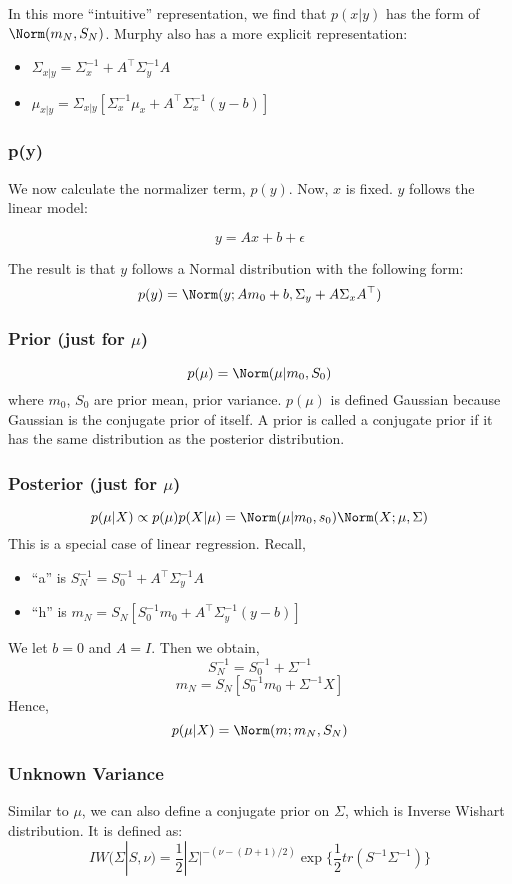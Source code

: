 \documentclass{article}
\begin{document}
In this more ``intuitive'' representation, we find that $p(x|y)$ has the form of $\Norm(m_N, S_N)$. Murphy also has a more explicit representation:

\begin{itemize}
\item $\Sigma_{x|y} = \Sigma_x^{-1} + A^\top \Sigma_y^{-1}A$
\item $\mu_{x|y} = \Sigma_{x|y} [\Sigma_x^{-1} \mu_x + A^\top \Sigma_x^{-1}(y - b)]$
\end{itemize}

\subsubsection{p(y)}

We now calculate the normalizer term, $p(y)$. Now, $x$ is fixed. $y$ follows the linear model:

$$y = Ax + b + \epsilon$$

The result is that $y$ follows a Normal distribution with the following form:
$$p(y) = \Norm(y;Am_0 + b, \Sigma_y + A \Sigma_x A^\top)$$

\subsubsection{Prior (just for $\mu$)}
$$p(\mu) = \Norm(\mu|m_0,S_0)$$
where $m_0$, $S_0$ are prior mean, prior variance. $p(\mu)$ is defined Gaussian because Gaussian is the conjugate prior of itself. A prior is called a conjugate prior if it has the same distribution as the posterior distribution.

\subsubsection{Posterior (just for $\mu$)}
$$p(\mu|X) \propto p(\mu)p(X|\mu) = \Norm(\mu|m_0,s_0)\Norm(X;\mu,\Sigma)$$
This is a special case of linear regression. Recall,
\begin{itemize}
\item ``a'' is $S_N^{-1} = S_0^{-1} + A^\top \Sigma_y^{-1}A$
\item ``h'' is $m_N = S_N \left[S_0^{-1}m_0 + A^\top \Sigma_y^{-1}(y - b)\right]$
\end{itemize}
We let $b=0$ and $A=I$. Then we obtain,
$$S_N^{-1} = S_0^{-1} + \Sigma^{-1}$$
$$m_N = S_N[S_0^{-1}m_0+\Sigma^{-1}X]$$
Hence,
$$p(\mu|X) = \Norm(m;m_N,S_N)$$

\subsubsection{Unknown Variance}
Similar to $\mu$, we can also define a conjugate prior on $\Sigma$, which is Inverse Wishart distribution. It is defined as:
$$IW(\Sigma|S,\nu)=\frac{1}{2}|\Sigma|^{-(\nu-(D+1)/2)}\exp\{\frac{1}{2}tr(S^{-1}\Sigma^{-1})\}$$
\end{document}
